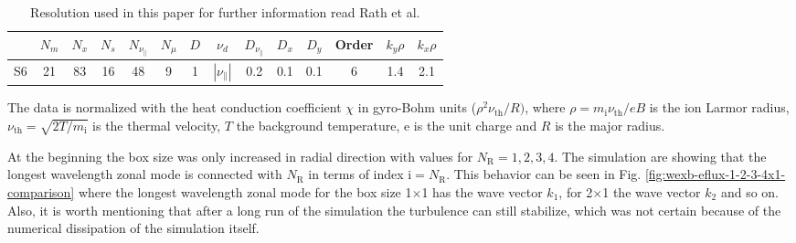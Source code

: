 \documentclass[aip, amsmath, amssymb, reprint, twocolumn]{revtex4-1}
\begin{document}
\begin{table}[ht]
	\begin{ruledtabular}
		\begin{tabular}{l | ccccc | ccccc | c | cc}
			& $N_m$ & $N_x$ & $N_s$ & $N_{\nu_\parallel}$ & $N_\mu$ & $D$ & $\nu_d$           & $D_{\nu_\parallel}$ & $D_x$ & $D_y$ & Order & $k_y\rho$ & $k_x\rho$ \\
			\hline
			S6   & 21    & 83    & 16    & 48                  & 9       & 1   & $|\nu_\parallel|$ & 0.2                 & 0.1   & 0.1   & 6     & 1.4       & 2.1       \\
		\end{tabular}
	\end{ruledtabular}
	\caption{
		Resolution used in this paper for further information read Rath et al. \cite{doi:10.1063/1.4961231} %
	}
	\label{tab:resolution}
\end{table}

The data is normalized with the heat conduction coefficient $\chi$ in gyro-Bohm units ($\rho^2\nu_{\mathrm{th}}/R)$, where $\rho = m_\mathrm{i}\nu_{\mathrm{th}}/eB$ is the ion Larmor radius, $\nu_{\mathrm{th}} = \sqrt{2T/m_\mathrm{i}}$ is the thermal velocity, $T$ the background temperature, e is the unit charge and $R$ is the major radius. \bigskip



At the beginning the box size was only increased in radial direction with values for $N_\mathrm{R} = 1, 2, 3, 4$. The simulation are showing that the longest wavelength zonal mode is connected with $N_\mathrm{R}$ in terms of index $\mathrm{i} = N_\mathrm{R}$. This behavior can be seen in Fig. \ref{fig:wexb-eflux-1-2-3-4x1-comparison} where the longest wavelength zonal mode for the box size 1$\times$1 has the wave vector $k_1$, for 2$\times$1 the wave vector $k_2$ and so on. Also, it is worth mentioning that after a long run of the simulation the turbulence can still stabilize, which was not certain because of the numerical dissipation of the simulation itself. \cite{doi:10.1063/1.4961231}
\end{document}
